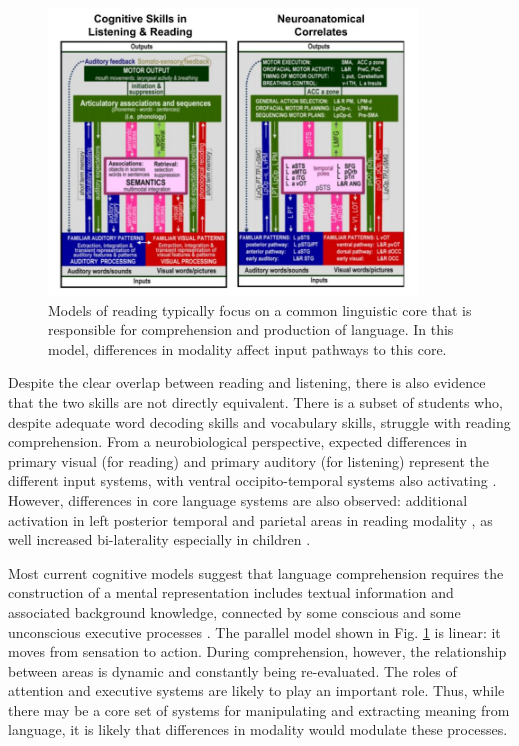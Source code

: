 \begin{figure}[t]
	\centering
	\includegraphics[height=3in]{images/ch3-price-language-models.jpg}
	\caption[Schematics of skills and brain areas used in reading.]{Models of reading typically focus on a common linguistic core that is responsible for comprehension and production of language. In this model, differences in modality affect input pathways to this core.}
	\label{fig:ch3-price-language-models}
\end{figure}

Despite the clear overlap between reading and listening, there is also evidence that the two skills are not directly equivalent. There is a subset of students who, despite adequate word decoding skills and vocabulary skills, struggle with reading comprehension\citep{Pimperton2010, Spencer2014}. From a neurobiological perspective, expected differences in primary visual (for reading) and primary auditory (for listening) represent the different input systems, with ventral occipito-temporal systems also activating \citep{Jobard2007}. However, differences in core language systems are also observed: additional activation in left posterior temporal and parietal areas in reading modality \citep{Constable2004}, as well increased bi-laterality especially in children \citep{Berl2011}. 

Most current cognitive models suggest that language comprehension requires the construction of a mental representation includes textual information and associated background knowledge, connected by some conscious and some unconscious executive processes \citep{Kendeou2014}. The parallel model shown in Fig. \ref{fig:ch3-price-language-models} is linear: it moves from sensation to action. During comprehension, however, the relationship between areas is dynamic and constantly being re-evaluated. The roles of attention and executive systems are likely to play an important role. Thus, while there may be a core set of systems for manipulating and extracting meaning from language, it is likely that differences in modality would modulate these processes. 


